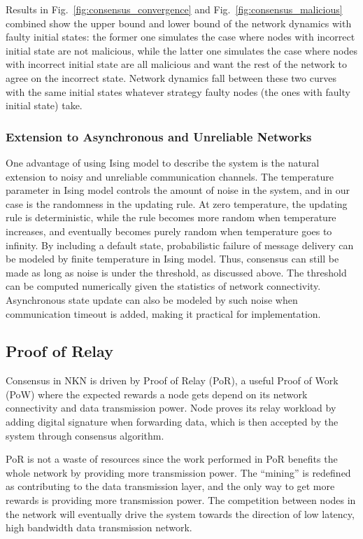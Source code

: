 \documentclass[reprint,pre,aps]{revtex4-1}
\begin{document}
Results in Fig.~\ref{fig:consensus_convergence} and Fig.~\ref{fig:consensus_malicious} combined show the upper bound and lower bound of the network dynamics with faulty initial states: the former one simulates the case where nodes with incorrect initial state are not malicious, while the latter one simulates the case where nodes with incorrect initial state are all malicious and want the rest of the network to agree on the incorrect state. Network dynamics fall between these two curves with the same initial states whatever strategy faulty nodes (the ones with faulty initial state) take.

\subsubsection{Extension to Asynchronous and Unreliable Networks}

One advantage of using Ising model to describe the system is the natural extension to noisy and unreliable communication channels. The temperature parameter in Ising model controls the amount of noise in the system, and in our case is the randomness in the updating rule. At zero temperature, the updating rule is deterministic, while the rule becomes more random when temperature increases, and eventually becomes purely random when temperature goes to infinity. By including a default state, probabilistic failure of message delivery can be modeled by finite temperature in Ising model. Thus, consensus can still be made as long as noise is under the threshold, as discussed above. The threshold can be computed numerically given the statistics of network connectivity. Asynchronous state update can also be modeled by such noise when communication timeout is added, making it practical for implementation.

\subsection{Proof of Relay}

Consensus in NKN is driven by Proof of Relay (PoR), a useful Proof of Work (PoW) where the expected rewards a node gets depend on its network connectivity and data transmission power. Node proves its relay workload by adding digital signature when forwarding data, which is then accepted by the system through consensus algorithm.

PoR is not a waste of resources since the work performed in PoR benefits the whole network by providing more transmission power. The ``mining'' is redefined as contributing to the data transmission layer, and the only way to get more rewards is providing more transmission power. The competition between nodes in the network will eventually drive the system towards the direction of low latency, high bandwidth data transmission network.
\end{document}
